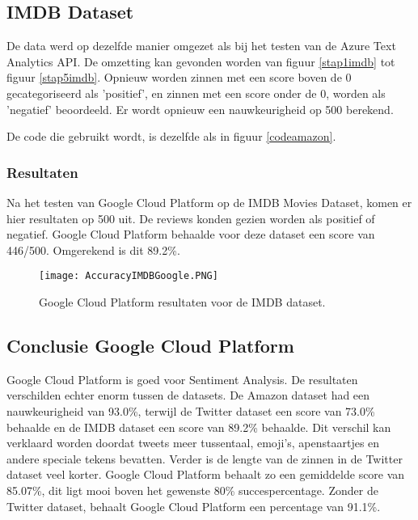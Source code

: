 \subsection{IMDB Dataset}
\label{imdbgoogleplatform}
De data werd op dezelfde manier omgezet als bij het testen van de Azure Text Analytics API. De omzetting kan gevonden worden van figuur \ref{stap1imdb} tot figuur \ref{stap5imdb}. Opnieuw worden zinnen met een score boven de 0 gecategoriseerd als 'positief', en zinnen met een score onder de 0, worden als 'negatief' beoordeeld. Er wordt opnieuw een nauwkeurigheid op 500 berekend.

De code die gebruikt wordt, is dezelfde als in figuur \ref{codeamazon}.


\subsubsection{Resultaten}
\label{imdbresultatengoogleplatform}
Na het testen van Google Cloud Platform op de IMDB Movies Dataset, komen er hier resultaten op 500 uit. De reviews konden gezien worden als positief of negatief. Google Cloud Platform behaalde voor deze dataset een score van 446/500. Omgerekend is dit 89.2\%.

\begin{figure}[!htbp]
    \texttt{[image: AccuracyIMDBGoogle.PNG]}
    \caption{\label{accuracyimdb}Google Cloud Platform resultaten voor de IMDB dataset.}
\end{figure}
\FloatBarrier 
\subsection{Conclusie Google Cloud Platform}
\label{conclusieGoogleCloudPlatform}

Google Cloud Platform is goed voor Sentiment Analysis. De resultaten verschilden echter enorm tussen de datasets. De Amazon dataset had een nauwkeurigheid van 93.0\%, terwijl de Twitter dataset een score van 73.0\% behaalde en de IMDB dataset een score van 89.2\% behaalde. Dit verschil kan verklaard worden doordat tweets meer tussentaal, emoji's, apenstaartjes en andere speciale tekens bevatten. Verder is de lengte van de zinnen in de Twitter dataset veel korter. Google Cloud Platform behaalt zo een gemiddelde score van 85.07\%, dit ligt mooi boven het gewenste 80\% succespercentage. Zonder de Twitter dataset, behaalt Google Cloud Platform een percentage van 91.1\%.


